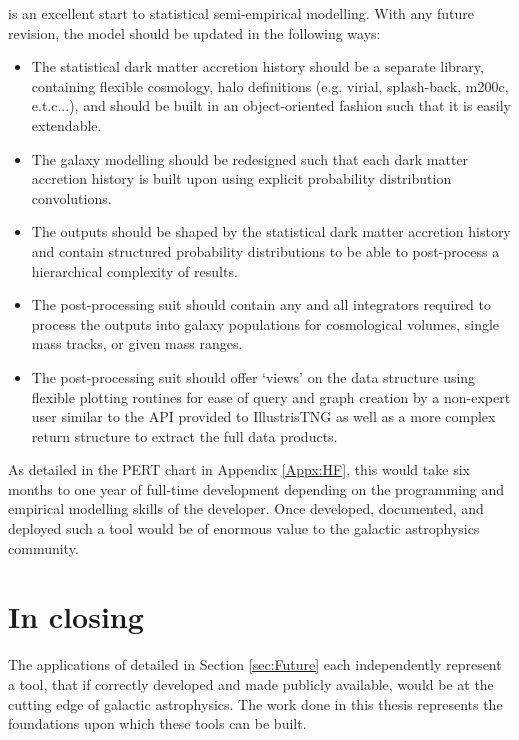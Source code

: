\steel is an excellent start to statistical semi-empirical modelling. With any future revision, the model should be updated in the following ways:

\begin{itemize}
    \item The statistical dark matter accretion history should be a separate library, containing flexible cosmology, halo definitions (e.g. virial, splash-back, m200c, e.t.c...), and should be built in an object-oriented fashion such that it is easily extendable.
    \item The galaxy modelling should be redesigned such that each dark matter accretion history is built upon using explicit probability distribution convolutions.
    \item The outputs should be shaped by the statistical dark matter accretion history and contain structured probability distributions to be able to post-process a hierarchical complexity of results.
    \item The post-processing suit should contain any and all integrators required to process the outputs into galaxy populations for cosmological volumes, single mass tracks, or given mass ranges.
    \item The post-processing suit should offer `views' on the data structure using flexible plotting routines for ease of query and graph creation by a non-expert user similar to the API provided to IllustrisTNG \cite[][https://www.tng-project.org/data/vis/]{Nelson2019TheRelease} as well as a more complex return structure to extract the full data products.
\end{itemize}

As detailed in the PERT chart in Appendix \ref{Appx:HF}, this would take six months to one year of full-time development depending on the programming and empirical modelling skills of the developer. Once developed, documented, and deployed such a tool would be of enormous value to the galactic astrophysics community. 

\section{In closing}

The applications of \steel detailed in Section \ref{sec:Future} each independently represent a tool, that if correctly developed and made publicly available, would be at the cutting edge of galactic astrophysics. The work done in this thesis represents the foundations upon which these tools can be built. 

